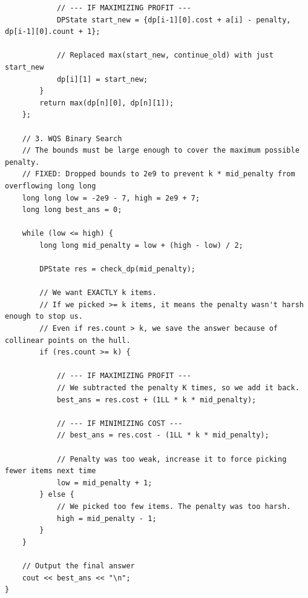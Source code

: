 \documentclass[9pt,a4paper,twocolumn]{extarticle}
\begin{document}
\begin{lstlisting}
            // --- IF MAXIMIZING PROFIT ---
            DPState start_new = {dp[i-1][0].cost + a[i] - penalty, dp[i-1][0].count + 1};

            // Replaced max(start_new, continue_old) with just start_new
            dp[i][1] = start_new;
        }
        return max(dp[n][0], dp[n][1]);
    };

    // 3. WQS Binary Search
    // The bounds must be large enough to cover the maximum possible penalty.
    // FIXED: Dropped bounds to 2e9 to prevent k * mid_penalty from overflowing long long
    long long low = -2e9 - 7, high = 2e9 + 7;
    long long best_ans = 0;

    while (low <= high) {
        long long mid_penalty = low + (high - low) / 2;

        DPState res = check_dp(mid_penalty);

        // We want EXACTLY k items.
        // If we picked >= k items, it means the penalty wasn't harsh enough to stop us.
        // Even if res.count > k, we save the answer because of collinear points on the hull.
        if (res.count >= k) {

            // --- IF MAXIMIZING PROFIT ---
            // We subtracted the penalty K times, so we add it back.
            best_ans = res.cost + (1LL * k * mid_penalty);

            // --- IF MINIMIZING COST ---
            // best_ans = res.cost - (1LL * k * mid_penalty);

            // Penalty was too weak, increase it to force picking fewer items next time
            low = mid_penalty + 1;
        } else {
            // We picked too few items. The penalty was too harsh.
            high = mid_penalty - 1;
        }
    }

    // Output the final answer
    cout << best_ans << "\n";
}
\end{lstlisting}

\filbreak
\end{document}
